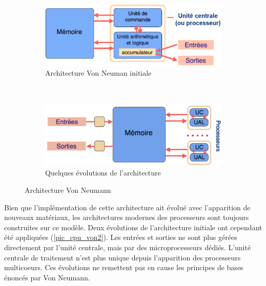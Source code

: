         \begin{figure}
            \centering
            \begin{subfigure}[b]{0.45\linewidth}
                \includegraphics[width=\linewidth]{images/cpu_von1.png}
                \caption{Architecture Von Neuman initiale}
                \label{pic_cpu_von}
            \end{subfigure}
            ~ %
            \begin{subfigure}[b]{0.45\linewidth}
                \includegraphics[width=\linewidth]{images/cpu_von_new.png}
                \caption{Quelques évolutions de l'architecture}
                \label{pic_cpu_von2}
            \end{subfigure}
            \caption{Architecture Von Neumann\protect\footnotemark }\label{fig:cpu_archi_von}
        \end{figure}
        
        
        Bien que l'implémentation de cette architecture ait évolué avec l'apparition de nouveaux matériaux, les architectures modernes des processeurs sont toujours construites sur ce modèle. Deux évolutions de l'architecture initiale ont cependant été appliquées (\autoref{pic_cpu_von2}). Les entrées et sorties ne sont plus gérées directement par l'unité centrale, mais par des microprocesseurs dédiés. L'unité centrale de traitement n'est plus unique depuis l'apparition des processeurs multicoeurs. Ces évolutions ne remettent pas en cause les principes de bases énoncés par Von Neumann. 


